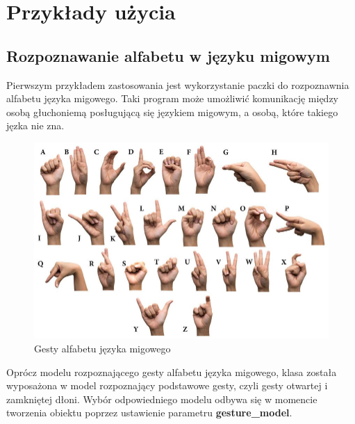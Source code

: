 \section{Przykłady użycia}
\subsection{Rozpoznawanie alfabetu w języku migowym}
\quad Pierwszym przykładem zastosowania jest wykorzystanie paczki do rozpoznawnia alfabetu języka migowego. Taki program może umożliwić komunikację między osobą głuchoniemą posługującą się językiem migowym, a osobą, które takiego jęzka nie zna. 


\begin{figure}[H]
    \begin{center}
        \includegraphics[width=15cm]{../images/american_sign_language.jpg}
        \caption{Gesty alfabetu języka migowego}
    \end{center}
\end{figure}

\quad Oprócz modelu rozpoznającego gesty alfabetu języka migowego, klasa została wyposażona w model rozpoznający podstawowe gesty, czyli gesty otwartej i zamkniętej dłoni. Wybór odpowiedniego modelu odbywa się w momencie tworzenia obiektu poprzez ustawienie parametru \textbf{gesture\_model}.


